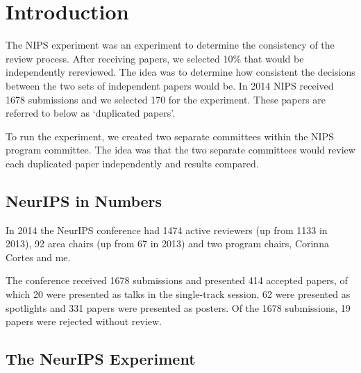 


\hypertarget{introduction}{%
\section{Introduction}\label{introduction}}

The NIPS experiment was an experiment to determine the consistency of
the review process. After receiving papers, we selected 10\% that would
be independently rereviewed. The idea was to determine how consistent
the decisions between the two sets of independent papers would be. In
2014 NIPS received 1678 submissions and we selected 170 for the
experiment. These papers are referred to below as `duplicated papers'.

To run the experiment, we created two separate committees within the
NIPS program committee. The idea was that the two separate committees
would review each duplicated paper independently and results compared.

\hypertarget{neurips-in-numbers}{%
\subsection{NeurIPS in Numbers}\label{neurips-in-numbers}}

\begin{flushright}
\end{flushright}

In 2014 the NeurIPS conference had 1474 active reviewers (up from 1133
in 2013), 92 area chairs (up from 67 in 2013) and two program chairs,
Corinna Cortes and me.

The conference received 1678 submissions and presented 414 accepted
papers, of which 20 were presented as talks in the single-track session,
62 were presented as spotlights and 331 papers were presented as
posters. Of the 1678 submissions, 19 papers were rejected without
review.

\hypertarget{the-neurips-experiment}{%
\subsection{The NeurIPS Experiment}\label{the-neurips-experiment}}

